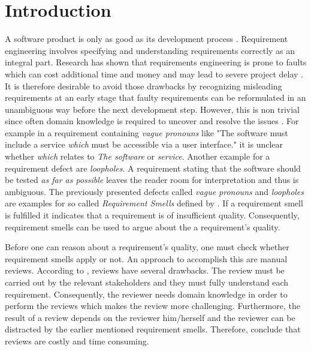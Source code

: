 
\chapter{Introduction}
\label{chapter:introduction}

A software product is only as good as its development process \parencite{Hsia:1993}.
Requirement engineering involves specifying and understanding requirements correctly as an integral part.
Research has shown that requirements engineering is prone to faults which can cost additional time and money \parencite{Mendez:2006} and may lead to severe project delay \parencite{Femmer:2014}.
It is therefore desirable to avoid those drawbacks by recognizing misleading requirements at an early stage that faulty requirements can be reformulated in an unambiguous way before the next development step.
However, this is non trivial since often domain knowledge is required to uncover and resolve the issues \parencite{Femmer:2017}.
For example in a requirement containing \textit{vague pronouns} like "The software must include a service \textit{which} must be accessible via a user interface." it is unclear whether \textit{which} relates to \textit{The software} or \textit{service}.
Another example for a requirement defect are \textit{loopholes}.
A requirement stating that the software should be tested \textit{as far as possible} leaves the reader room for interpretation and thus is ambiguous.
The previously presented defects called \textit{vague pronouns} and \textit{loopholes} are examples for so called \textit{Requirement Smells} defined by \textcite{Femmer:2017}.
If a requirement smell is fulfilled it indicates that a requirement is of insufficient quality.
Consequently, requirement smells can be used to argue about the a requirement's quality.

Before one can reason about a requirement's quality, one must check whether requirement smells apply or not.
An approach to accomplish this are manual reviews.
According to \textcite{Salger:2013}, reviews have several drawbacks.
The review must be carried out by the relevant stakeholders and they must fully understand each requirement.
Consequently, the reviewer needs domain knowledge in order to perform the reviews which makes the review more challenging.
Furthermore, the result of a review depends on the reviewer him/herself \parencite{Zelkowitz:1983} and the reviewer can be distracted by the earlier mentioned requirement smells.
Therefore, \textcite{Femmer:2017} conclude that reviews are costly and time consuming.

